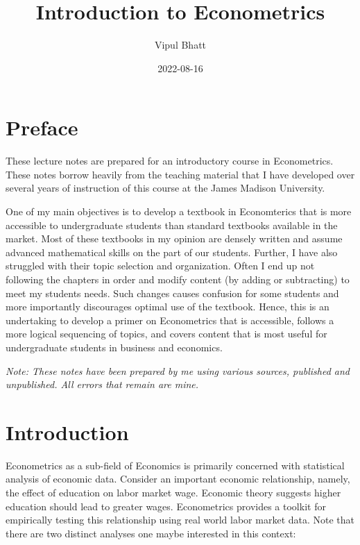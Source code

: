 \documentclass[
]{book}
\title{Introduction to Econometrics}
\author{Vipul Bhatt}
\date{2022-08-16}
\theoremstyle{definition}
\theoremstyle{definition}
\theoremstyle{definition}
\theoremstyle{definition}
\theoremstyle{remark}
\begin{document}
\maketitle

{
\setcounter{tocdepth}{1}
\tableofcontents
}
\hypertarget{preface}{%
\chapter*{Preface}\label{preface}}

These lecture notes are prepared for an introductory course in Econometrics. These notes borrow heavily from the teaching material that I have developed over several years of instruction of this course at the James Madison University.

One of my main objectives is to develop a textbook in Economterics that is more accessible to undergraduate students than standard textbooks available in the market. Most of these textbooks in my opinion are densely written and assume advanced mathematical skills on the part of our students. Further, I have also struggled with their topic selection and organization. Often I end up not following the chapters in order and modify content (by adding or subtracting) to meet my students needs. Such changes causes confusion for some students and more importantly discourages optimal use of the textbook. Hence, this is an undertaking to develop a primer on Econometrics that is accessible, follows a more logical sequencing of topics, and covers content that is most useful for undergraduate students in business and economics.

\emph{Note: These notes have been prepared by me using various sources, published and unpublished. All errors that remain are mine.}

\hypertarget{intro}{%
\chapter*{Introduction}\label{intro}}

Econometrics as a sub-field of Economics is primarily concerned with statistical analysis of economic data. Consider an important economic relationship, namely, the effect of education on labor market wage. Economic theory suggests higher education should lead to greater wages. Econometrics provides a toolkit for empirically testing this relationship using real world labor market data. Note that there are two distinct analyses one maybe interested in this context:
\end{document}
